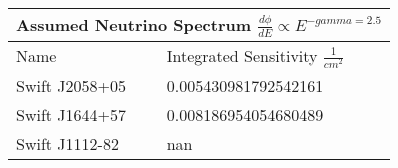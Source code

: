 \documentclass[]{article}
\begin{document}
\begin{tabular}{ |p{3.5cm}||p{4.5cm}|} 
\hline 
\multicolumn{2}{|c|}{Assumed Neutrino Spectrum $ \frac {d \phi}{dE} \propto E ^ {-gamma=2.5} $} \\ 
\hline 
Name&Integrated Sensitivity $\frac{1}{cm^{2}} $ \\ 
\hline 
Swift J2058+05 & \num[round-precision=2, round-mode=figures, scientific-notation=true]{0.005430981792542161}  \\ 
Swift J1644+57 & \num[round-precision=2, round-mode=figures, scientific-notation=true]{0.008186954054680489}  \\ 
Swift J1112-82 & \num[round-precision=2, round-mode=figures, scientific-notation=true]{nan}  \\ 
\hline 
\end{tabular} 
\end{document}
